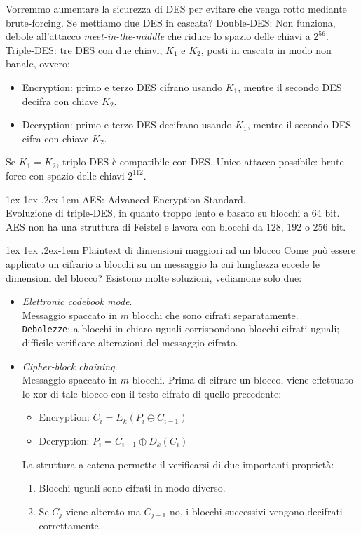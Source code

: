 \documentclass[a4paper, 11pt, notitlepage, fleqn]{report}
\makeatletter
\renewcommand{\paragraph}{%
	\@startsection{paragraph}{4}%
	{\z@}{1ex \@plus 1ex \@minus .2ex}{-1em}%
	{\normalfont\normalsize\bfseries}%
}
\makeatother
\begin{document}
Vorremmo aumentare la sicurezza di DES per evitare che venga rotto mediante brute-forcing. Se mettiamo due DES in cascata? Double-DES: Non funziona, debole all'attacco \emph{meet-in-the-middle} che riduce lo spazio delle chiavi a $2^{56}$.\\
Triple-DES: tre DES  con due chiavi, $K_1$ e $K_2$, posti in cascata in modo non banale, ovvero:
\begin{itemize}
	\item Encryption: primo e terzo DES cifrano usando $K_1$, mentre il secondo DES decifra con chiave $K_2$.
	\item Decryption: primo e terzo DES decifrano usando $K_1$, mentre il secondo DES cifra con chiave $K_2$.
\end{itemize}
Se $K_1 = K_2$, triplo DES è compatibile con DES. Unico attacco possibile: brute-force con spazio delle chiavi $2^{112}$.

\paragraph{AES:} Advanced Encryption Standard.\\
Evoluzione di triple-DES, in quanto troppo lento e basato su blocchi a 64 bit. AES non ha una struttura di Feistel e lavora con blocchi da 128, 192 o 256 bit.

\paragraph{Plaintext di dimensioni maggiori ad un blocco}
Come può essere applicato un cifrario a blocchi su un messaggio la cui lunghezza eccede le dimensioni del blocco? Esistono molte soluzioni, vediamone solo due:
\begin{itemize}
	\item \emph{Elettronic codebook mode}.\\
	Messaggio spaccato in $m$ blocchi che sono cifrati separatamente.\\
	\texttt{Debolezze}: a blocchi in chiaro uguali corrispondono blocchi cifrati uguali; difficile verificare alterazioni del messaggio cifrato.
	\item \emph{Cipher-block chaining}.\\
	Messaggio spaccato in $m$ blocchi. Prima di cifrare un blocco, viene effettuato lo xor di tale blocco con il testo cifrato di quello precedente:
	\begin{itemize}
		\item[] Encryption: $C_i = E_k(P_i \oplus C_{i-1})$
		\item[] Decryption: $P_i = C_{i-1} \oplus D_k(C_i)$
	\end{itemize}
	La struttura a catena permette il verificarsi di due importanti proprietà:
	\begin{enumerate}
		\item Blocchi uguali sono cifrati in modo diverso.
		\item Se $C_j$ viene alterato ma $C_{j+1}$ no, i blocchi successivi vengono decifrati correttamente.
	\end{enumerate}
\end{itemize}
\end{document}
